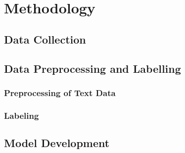 \section{Methodology}
\subsection{Data Collection}

\subsection{Data Preprocessing and Labelling}
\subsubsection{Preprocessing of Text Data}
\subsubsection{Labeling}

\subsection{Model Development}